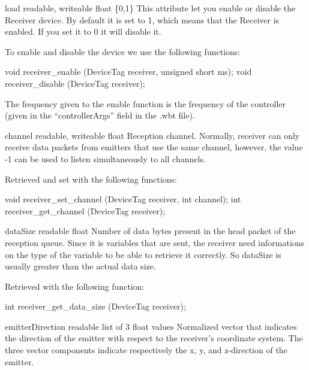 \begin{itemize}
\begin{attribute}{load}
  {readable, writeable}
  {float}
  {\{0,1\}}
  This attribute let you enable or disable the Receiver
  device.  By default it is set to 1, which means that the Receiver is
  enabled. If you set it to 0 it will disable it.

  To enable and disable the device we use the following \webots functions:

\begin{cxx}
void receiver_enable  (DeviceTag receiver, unsigned short ms);
void receiver_disable (DeviceTag receiver);
\end{cxx}

The frequency given to the enable function is the frequency of the
\urbi controller (given in the ``controllerArgs'' field in the .wbt
file).
\end{attribute}

\begin{attribute}{channel}
  {readable, writeable}
  {float}
  {}
  Reception channel. Normally, receiver can only receive
  data packets from emitters that use the same channel, however, the
  value -{}1 can be used to listen simultaneously to all channels.

  Retrieved and set with the following \webots functions:
\begin{cxx}
void receiver_set_channel  (DeviceTag receiver, int channel);
int receiver_get_channel (DeviceTag receiver);
\end{cxx}
\end{attribute}

\begin{attribute}{dataSize}
  {readable}
  {float}
  {}
  Number of data bytes present in the head packet of the
  reception queue. Since it is \urbi variables that are sent, the
  receiver need informations on the type of the variable to be able to
  retrieve it correctly. So dataSize is usually greater than the actual
  data size.

  Retrieved with the following \webots function:

\begin{cxx}
int receiver_get_data_size  (DeviceTag receiver);
\end{cxx}
\end{attribute}

\begin{attribute}{emitterDirection}
  {readable}
  {list of 3 float values}
  {}
  Normalized vector that indicates the direction of the
  emitter with respect to the receiver's coordinate system. The three
  vector components indicate respectively the x, y, and z-{}direction
  of the emitter.


\end{attribute}
\end{itemize}
